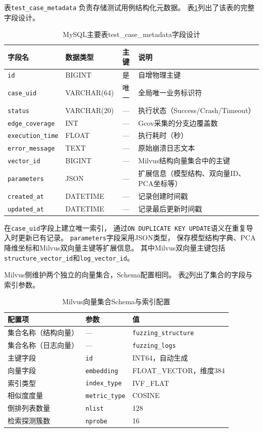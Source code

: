 表\texttt{test\_case\_metadata}
负责存储测试用例结构化元数据。
表\ref{tab:mysql_schema}列出了该表的完整字段设计。

\begin{table}[htbp]
\centering
\caption{MySQL主要表test\_case\_metadata字段设计}
\label{tab:mysql_schema}
\begin{tabular}{llcp{5.5cm}}
\toprule
字段名 & 数据类型 & 主键 & 说明 \\
\midrule
\texttt{id} & BIGINT & 是 & 自增物理主键 \\
\texttt{case\_uid} & VARCHAR(64) & 唯一 & 全局唯一业务标识符 \\
\texttt{status} & VARCHAR(20) & --- & 执行状态（Success/Crash/\allowbreak{}Timeout） \\
\texttt{edge\_coverage} & INT & --- & Gcov采集的分支边覆盖数 \\
\texttt{execution\_time} & FLOAT & --- & 执行耗时（秒） \\
\texttt{error\_message} & TEXT & --- & 原始崩溃日志文本 \\
\texttt{vector\_id} & BIGINT & --- & Milvus结构向量集合中的主键 \\
\texttt{parameters} & JSON & --- & 扩展信息（模型结构、双向量ID、\allowbreak{}PCA坐标等） \\
\texttt{created\_at} & DATETIME & --- & 记录创建时间戳 \\
\texttt{updated\_at} & DATETIME & --- & 记录最后更新时间戳 \\
\bottomrule
\end{tabular}
\end{table}

在\texttt{case\_uid}字段上建立唯一索引，
通过\texttt{ON DUPLICATE KEY UPDATE}语义在重复导入时更新已有记录。
\texttt{parameters}字段采用JSON类型，
保存模型结构字典、PCA降维坐标和Milvus双向量主键等扩展信息。
其中Milvus双向量主键包括\texttt{structure\_vector\_id}和\texttt{log\_vector\_id}。

Milvus侧维护两个独立的向量集合，Schema配置相同。
表\ref{tab:milvus_schema}列出了集合的字段与索引参数。

\begin{table}[htbp]
\centering
\caption{Milvus向量集合Schema与索引配置}
\label{tab:milvus_schema}
\begin{tabular}{lll}
\toprule
配置项 & 参数 & 值 \\
\midrule
集合名称（结构向量） & --- & \texttt{fuzzing\_structure} \\
集合名称（日志向量） & --- & \texttt{fuzzing\_logs} \\
主键字段 & \texttt{id} & INT64，自动生成 \\
向量字段 & \texttt{embedding} & FLOAT\_VECTOR，维度384 \\
索引类型 & \texttt{index\_type} & IVF\_FLAT \\
相似度度量 & \texttt{metric\_type} & COSINE \\
倒排列表数量 & \texttt{nlist} & 128 \\
检索探测簇数 & \texttt{nprobe} & 16 \\
\bottomrule
\end{tabular}
\end{table}

